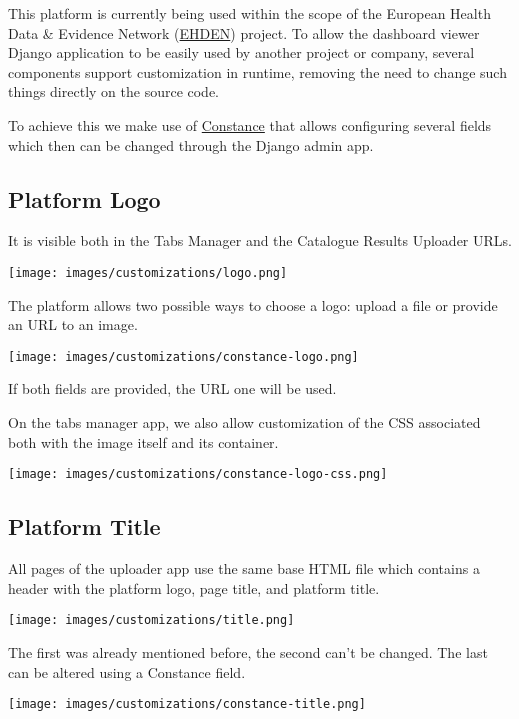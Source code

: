 \documentclass[
]{book}
\begin{document}
This platform is currently being used within the scope of the European Health Data \& Evidence Network (\href{https://www.ehden.eu/}{EHDEN}) project.
To allow the dashboard viewer Django application to be easily used by another project or company, several components support customization in runtime, removing the need to change such things directly on the source code.

To achieve this we make use of \href{https://github.com/jazzband/django-constance}{Constance} that allows configuring several fields which then can be changed through the Django admin app.

\hypertarget{platform-logo}{%
\subsection*{Platform Logo}\label{platform-logo}}

It is visible both in the Tabs Manager and the Catalogue Results Uploader URLs.

\texttt{[image: images/customizations/logo.png]}

The platform allows two possible ways to choose a logo: upload a file or provide an URL to an image.

\texttt{[image: images/customizations/constance-logo.png]}

If both fields are provided, the URL one will be used.

On the tabs manager app, we also allow customization of the CSS associated both with the image itself and its container.

\texttt{[image: images/customizations/constance-logo-css.png]}

\hypertarget{platform-title}{%
\subsection*{Platform Title}\label{platform-title}}

All pages of the uploader app use the same base HTML file which contains a header with the platform logo, page title, and platform title.

\texttt{[image: images/customizations/title.png]}

The first was already mentioned before, the second can't be changed.
The last can be altered using a Constance field.

\texttt{[image: images/customizations/constance-title.png]}
\end{document}
